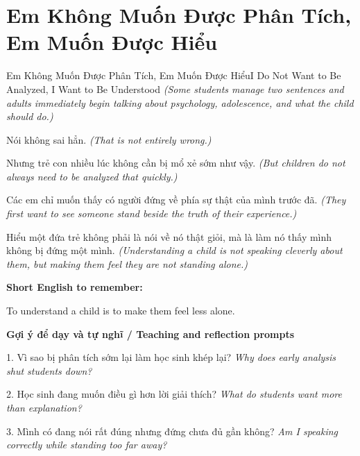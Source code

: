 \section{Em Không Muốn Được Phân Tích, Em Muốn Được Hiểu}
\begin{truyen}{Em Không Muốn Được Phân Tích, Em Muốn Được Hiểu}{I Do Not Want to Be Analyzed, I Want to Be Understood}
\textit{(Some students manage two sentences and adults immediately begin talking about psychology, adolescence, and what the child should do.)}

Nói không sai hẳn.
\textit{(That is not entirely wrong.)}

Nhưng trẻ con nhiều lúc không cần bị mổ xẻ sớm như vậy.
\textit{(But children do not always need to be analyzed that quickly.)}

Các em chỉ muốn thấy có người đứng về phía sự thật của mình trước đã.
\textit{(They first want to see someone stand beside the truth of their experience.)}

\end{truyen}

\begin{baihoc}
Hiểu một đứa trẻ không phải là nói về nó thật giỏi, mà là làm nó thấy mình không bị đứng một mình.
\textit{(Understanding a child is not speaking cleverly about them, but making them feel they are not standing alone.)}
\end{baihoc}

\begin{ghinhoanh}
\textbf{Short English to remember:}

To understand a child is to make them feel less alone.

\end{ghinhoanh}

\begin{tuhocnhanh}
\textbf{Gợi ý để dạy và tự nghĩ / Teaching and reflection prompts}

1. Vì sao bị phân tích sớm lại làm học sinh khép lại? \textit{Why does early analysis shut students down?}

2. Học sinh đang muốn điều gì hơn lời giải thích? \textit{What do students want more than explanation?}

3. Mình có đang nói rất đúng nhưng đứng chưa đủ gần không? \textit{Am I speaking correctly while standing too far away?}
\end{tuhocnhanh}
\ngancach

